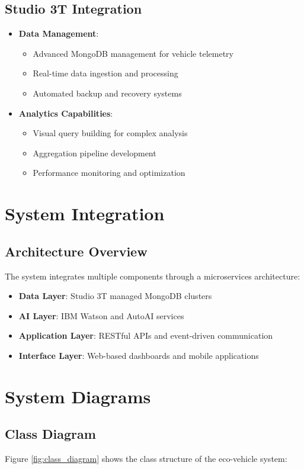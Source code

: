 \documentclass[12pt,a4paper]{article}
\begin{document}
\subsection{Studio 3T Integration}
\begin{itemize}
    \item \textbf{Data Management}:
        \begin{itemize}
            \item Advanced MongoDB management for vehicle telemetry
            \item Real-time data ingestion and processing
            \item Automated backup and recovery systems
        \end{itemize}
    \item \textbf{Analytics Capabilities}:
        \begin{itemize}
            \item Visual query building for complex analysis
            \item Aggregation pipeline development
            \item Performance monitoring and optimization
        \end{itemize}
\end{itemize}

\section{System Integration}
\subsection{Architecture Overview}
The system integrates multiple components through a microservices architecture:
\begin{itemize}
    \item \textbf{Data Layer}: Studio 3T managed MongoDB clusters
    \item \textbf{AI Layer}: IBM Watson and AutoAI services
    \item \textbf{Application Layer}: RESTful APIs and event-driven communication
    \item \textbf{Interface Layer}: Web-based dashboards and mobile applications
\end{itemize}

\section{System Diagrams}
\subsection{Class Diagram}
Figure \ref{fig:class_diagram} shows the class structure of the eco-vehicle system:
\end{document}
